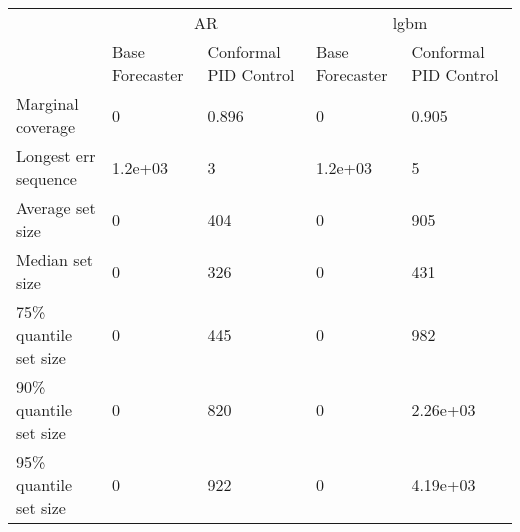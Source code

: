 \begin{tabular}{lllll}
\toprule
& \multicolumn{2}{c}{AR}& \multicolumn{2}{c}{lgbm} \\
& Base Forecaster & Conformal PID Control & Base Forecaster & Conformal PID Control \\
\midrule
Marginal coverage & 0 & 0.896 & 0 & 0.905 \\
Longest err sequence & 1.2e+03 & 3 & 1.2e+03 & 5 \\
Average set size & 0 & 404 & 0 & 905 \\
Median set size & 0 & 326 & 0 & 431 \\
75\% quantile set size & 0 & 445 & 0 & 982 \\
90\% quantile set size & 0 & 820 & 0 & 2.26e+03 \\
95\% quantile set size & 0 & 922 & 0 & 4.19e+03 \\
\bottomrule
\end{tabular}
